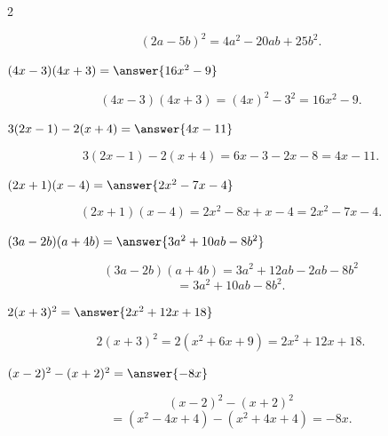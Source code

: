 \documentclass{ximera}
\begin{document}
\begin{oefening}[Uitwerken]{\oefB\ESS}
\begin{multicols}{2}
\begin{question}
    \begin{oplossing}
    \[
    (2a-5b)^2
    =4a^2-20ab+25b^2.
    \]
    \end{oplossing}
    \end{question}
    
    
    \begin{question}
    $(4x-3)(4x+3)=\answer{16x^2-9}$
    
    \begin{oplossing}
    \[
    (4x-3)(4x+3)
    =(4x)^2-3^2
    =16x^2-9.
    \]
    \end{oplossing}
    \end{question}
    
    
    \begin{question}
    $3(2x-1)-2(x+4)=\answer{4x-11}$
    
    \begin{oplossing}
    \[
    3(2x-1)-2(x+4)
    =6x-3-2x-8
    =4x-11.
    \]
    \end{oplossing}
    \end{question}
    
    
    \begin{question}
    $(2x+1)(x-4)=\answer{2x^2-7x-4}$
    
    \begin{oplossing}
    \[
    (2x+1)(x-4)
    =2x^2-8x+x-4
    =2x^2-7x-4.
    \]
    \end{oplossing}
    \end{question}
    
    
    \begin{question}
    $(3a-2b)(a+4b)=\answer{3a^2+10ab-8b^2}$
    
    \begin{oplossing}
    \[
    (3a-2b)(a+4b)
    =3a^2+12ab-2ab-8b^2
    \]
    \[
    =3a^2+10ab-8b^2.
    \]
    \end{oplossing}
    \end{question}
    
    
    \begin{question}
    $2(x+3)^2=\answer{2x^2+12x+18}$
    
    \begin{oplossing}
    \[
    2(x+3)^2
    =2(x^2+6x+9)
    =2x^2+12x+18.
    \]
    \end{oplossing}
    \end{question}
    
    
    \begin{question}
    $(x-2)^2-(x+2)^2=\answer{-8x}$
    
    \begin{oplossing}
    \[
    (x-2)^2-(x+2)^2
    \]
    \[
    =(x^2-4x+4)-(x^2+4x+4)
    =-8x.
    \]
    \end{oplossing}
    \end{question}
    
    \end{multicols}
    
    \end{oefening}
    
\end{document}
